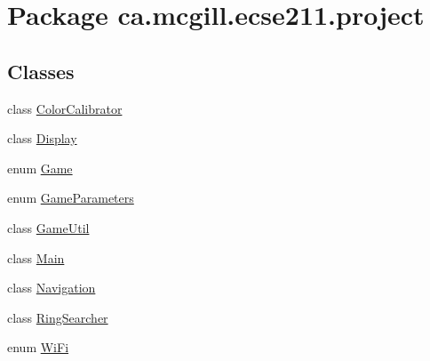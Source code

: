 \hypertarget{namespaceca_1_1mcgill_1_1ecse211_1_1project}{}\section{Package ca.\+mcgill.\+ecse211.\+project}
\label{namespaceca_1_1mcgill_1_1ecse211_1_1project}
\subsection*{Classes}
\begin{DoxyCompactItemize}
\item 
class \hyperlink{classca_1_1mcgill_1_1ecse211_1_1project_1_1_color_calibrator}{Color\+Calibrator}
\item 
class \hyperlink{classca_1_1mcgill_1_1ecse211_1_1project_1_1_display}{Display}
\item 
enum \hyperlink{enumca_1_1mcgill_1_1ecse211_1_1project_1_1_game}{Game}
\item 
enum \hyperlink{enumca_1_1mcgill_1_1ecse211_1_1project_1_1_game_parameters}{Game\+Parameters}
\item 
class \hyperlink{classca_1_1mcgill_1_1ecse211_1_1project_1_1_game_util}{Game\+Util}
\item 
class \hyperlink{classca_1_1mcgill_1_1ecse211_1_1project_1_1_main}{Main}
\item 
class \hyperlink{classca_1_1mcgill_1_1ecse211_1_1project_1_1_navigation}{Navigation}
\item 
class \hyperlink{classca_1_1mcgill_1_1ecse211_1_1project_1_1_ring_searcher}{Ring\+Searcher}
\item 
enum \hyperlink{enumca_1_1mcgill_1_1ecse211_1_1project_1_1_wi_fi}{Wi\+Fi}
\end{DoxyCompactItemize}
